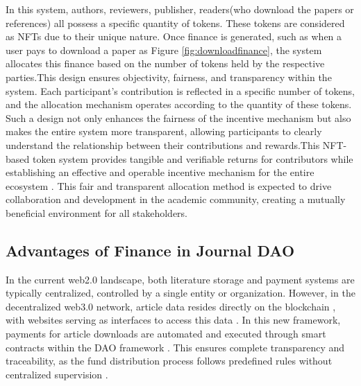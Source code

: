 \documentclass[lettersize,journal]{IEEEtran}
\begin{document}
In this system, authors, reviewers, publisher, readers(who download the papers or references) all possess a specific quantity of tokens. These tokens are considered as NFTs due to their unique nature. Once finance is generated, such as when a user pays to download a paper as Figure \ref{fig:downloadfinance}, the system allocates this finance based on the number of tokens held by the respective parties.This design ensures objectivity, fairness, and transparency within the system. Each participant's contribution is reflected in a specific number of tokens, and the allocation mechanism operates according to the quantity of these tokens. Such a design not only enhances the fairness of the incentive mechanism but also makes the entire system more transparent, allowing participants to clearly understand the relationship between their contributions and rewards.This NFT-based token system provides tangible and verifiable returns for contributors while establishing an effective and operable incentive mechanism for the entire ecosystem \cite{kong2021alternative}. This fair and transparent allocation method is expected to drive collaboration and development in the academic community, creating a mutually beneficial environment for all stakeholders.




\subsection{Advantages of Finance in Journal DAO}


In the current web2.0 landscape, both literature storage and payment systems are typically centralized, controlled by a single entity or organization. However, in the decentralized web3.0 network, article data resides directly on the blockchain \cite{alabdulwahhab2018web}, with websites serving as interfaces to access this data \cite{10402553} \cite{971982} \cite{6222336}. 
In this new framework, payments for article downloads are automated and executed through smart contracts within the DAO framework \cite{cao2022decentralized}. This ensures complete transparency and traceability, as the fund distribution process follows predefined rules without centralized supervision \cite{10302676}. 
\end{document}
